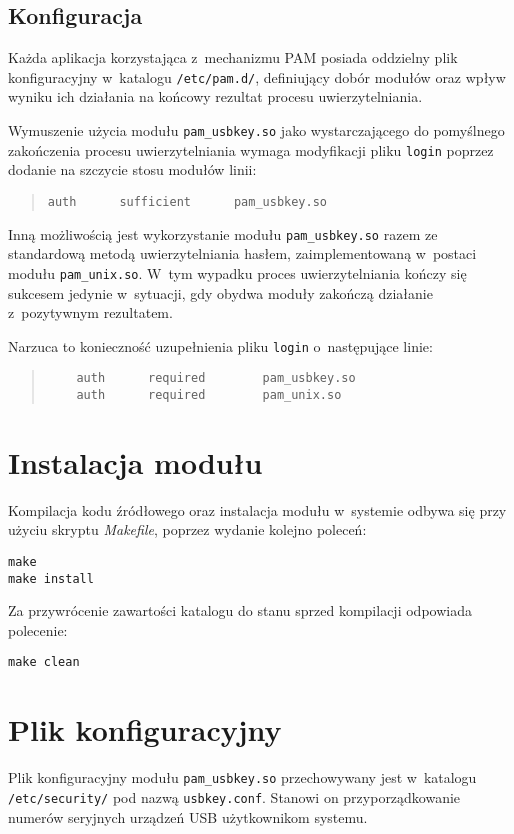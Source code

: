 \documentclass[a4paper,11pt]{article}
\begin{document}
\subsection{Konfiguracja}
Każda aplikacja korzystająca z~mechanizmu PAM posiada oddzielny plik konfiguracyjny w~katalogu \verb|/etc/pam.d/|, definiujący dobór modułów oraz wpływ wyniku ich działania na końcowy rezultat procesu uwierzytelniania.

Wymuszenie użycia modułu \verb|pam_usbkey.so| jako wystarczającego do pomyślnego zakończenia procesu uwierzytelniania wymaga modyfikacji pliku \verb|login| poprzez dodanie na szczycie stosu modułów linii:
\begin{quote}
	\verb|auth      sufficient      pam_usbkey.so|
\end{quote}

Inną możliwością jest wykorzystanie modułu \verb|pam_usbkey.so| razem ze standardową metodą uwierzytelniania hasłem, zaimplementowaną w~postaci modułu \verb|pam_unix.so|. W~tym wypadku proces uwierzytelniania kończy się sukcesem jedynie w~sytuacji, gdy obydwa moduły zakończą działanie z~pozytywnym rezultatem.

Narzuca to konieczność uzupełnienia pliku \verb|login| o~następujące linie:
\begin{quote}
	\begin{verbatim}
	auth      required        pam_usbkey.so
	auth      required        pam_unix.so
	\end{verbatim}
\end{quote}


\section{Instalacja modułu}
Kompilacja kodu źródłowego oraz instalacja modułu w~systemie odbywa się przy użyciu skryptu \emph{Makefile}, poprzez wydanie kolejno poleceń:
\begin{verbatim}
make
make install
\end{verbatim}

Za przywrócenie zawartości katalogu do stanu sprzed kompilacji odpowiada polecenie:
\begin{verbatim}
make clean
\end{verbatim}


\section{Plik konfiguracyjny}
Plik konfiguracyjny modułu \verb|pam_usbkey.so| przechowywany jest w~katalogu \linebreak \verb|/etc/security/| pod nazwą \verb|usbkey.conf|. Stanowi on przyporządkowanie numerów seryjnych urządzeń USB użytkownikom systemu.
\end{document}

